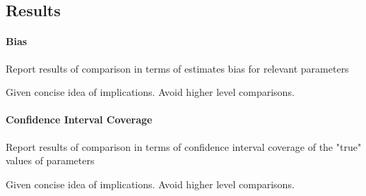 \subsection{Results}

\paragraph{Bias}
	Report results of comparison in terms of estimates bias for relevant parameters

	Given concise idea of implications. Avoid higher level comparisons.
	
\paragraph{Confidence Interval Coverage}
	Report results of comparison in terms of confidence interval coverage of the "true" values of parameters 

	Given concise idea of implications. Avoid higher level comparisons.
	

